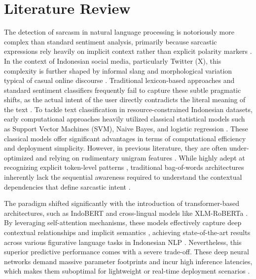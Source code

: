 \documentclass[conference]{IEEEtran}
\begin{document}
\section{Literature Review}

The detection of sarcasm in natural language processing is notoriously more complex than standard sentiment analysis, primarily because sarcastic expressions rely heavily on implicit context rather than explicit polarity markers \cite{joshi2017}. In the context of Indonesian social media, particularly Twitter (X), this complexity is further shaped by informal slang and morphological variation typical of casual online discourse \cite{Suhaeni2025Exploring}. Traditional lexicon-based approaches and standard sentiment classifiers frequently fail to capture these subtle pragmatic shifts, as the actual intent of the user directly contradicts the literal meaning of the text \cite{maynard2014}.
To tackle text classification in resource-constrained Indonesian datasets, early computational approaches heavily utilized classical statistical models such as Support Vector Machines (SVM), Naive Bayes, and logistic regression \cite{wijaya2013, wibowo2020}. These classical models offer significant advantages in terms of computational efficiency and deployment simplicity. However, in previous literature, they are often under-optimized and relying on rudimentary unigram features \cite{idsarcasm}. While highly adept at recognizing explicit token-level patterns \cite{Onan2021A}, traditional bag-of-words architectures inherently lack the sequential awareness required to understand the contextual dependencies that define sarcastic intent \cite{Eke2021Context-Based, Eke2021Multi-feature}.

The paradigm shifted significantly with the introduction of transformer-based architectures, such as IndoBERT \cite{wilie2020} and cross-lingual models like XLM-RoBERTa \cite{conneau2020}. By leveraging self-attention mechanisms, these models effectively capture deep contextual relationships and implicit semantics \cite{NIPS2017_3f5ee243}, achieving state-of-the-art results across various figurative language tasks in Indonesian NLP \cite{idsarcasm, 2024IndoBERTweet}. Nevertheless, this superior predictive performance comes with a severe trade-off. These deep neural networks demand massive parameter footprints and incur high inference latencies, which makes them suboptimal for lightweight or real-time deployment scenarios \cite{Tambe2020EdgeBERT:, Chan2023Deep, Shuvo2023Efficient}. 
\end{document}
